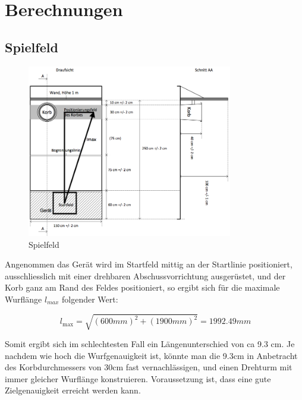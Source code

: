 \section{Berechnungen}
\label{sec:calc}

\subsection{Spielfeld}
\begin{figure}[h!]          
    \centering             
    \includegraphics[width=0.8\textwidth]{fig/Bild_Spielfeld.png}    
    \caption{Spielfeld}
    \label{fig:spielfeld}        
\end{figure}
\noindent
Angenommen das Gerät wird im Startfeld mittig an der Startlinie positioniert, 
ausschliesslich mit einer drehbaren Abschussvorrichtung ausgerüstet, und der 
Korb ganz am Rand des Feldes positioniert, so ergibt sich für die maximale 
Wurflänge $l_{max}$ folgender Wert: 

\[\ l_\text{max} = \sqrt{(600mm)^2 + (1900mm)^2} = 1992.49mm \]

Somit ergibt sich im schlechtesten Fall ein Längenunterschied von ca 9.3 cm. 
Je nachdem wie hoch die Wurfgenauigkeit ist, könnte man die 9.3cm in 
Anbetracht des Korbdurchmessers von 30cm fast vernachlässigen, und einen 
Drehturm mit immer gleicher Wurflänge konstruieren. Voraussetzung ist, dass 
eine gute Zielgenauigkeit erreicht werden kann.

